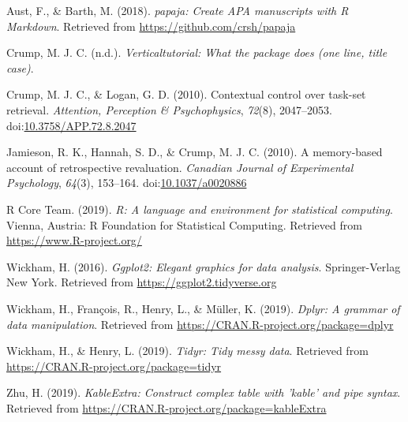 \documentclass[
  man]{apa6}
\newlength{\cslhangindent}
\newenvironment{cslreferences}%
  {\setlength{\parindent}{0pt}%
  \everypar{\setlength{\hangindent}{\cslhangindent}}\ignorespaces}%
  {\par}
\begin{document}
\hypertarget{refs}{}
\begin{cslreferences}
\leavevmode\hypertarget{ref-R-papaja}{}%
Aust, F., \& Barth, M. (2018). \emph{papaja: Create APA manuscripts with R Markdown}. Retrieved from \url{https://github.com/crsh/papaja}

\leavevmode\hypertarget{ref-R-verticaltutorial}{}%
Crump, M. J. C. (n.d.). \emph{Verticaltutorial: What the package does (one line, title case)}.

\leavevmode\hypertarget{ref-crumpContextualControlTaskset2010}{}%
Crump, M. J. C., \& Logan, G. D. (2010). Contextual control over task-set retrieval. \emph{Attention, Perception \& Psychophysics}, \emph{72}(8), 2047--2053. doi:\href{https://doi.org/10.3758/APP.72.8.2047}{10.3758/APP.72.8.2047}

\leavevmode\hypertarget{ref-jamiesonMemorybasedAccountRetrospective2010}{}%
Jamieson, R. K., Hannah, S. D., \& Crump, M. J. C. (2010). A memory-based account of retrospective revaluation. \emph{Canadian Journal of Experimental Psychology}, \emph{64}(3), 153--164. doi:\href{https://doi.org/10.1037/a0020886}{10.1037/a0020886}

\leavevmode\hypertarget{ref-R-base}{}%
R Core Team. (2019). \emph{R: A language and environment for statistical computing}. Vienna, Austria: R Foundation for Statistical Computing. Retrieved from \url{https://www.R-project.org/}

\leavevmode\hypertarget{ref-R-ggplot2}{}%
Wickham, H. (2016). \emph{Ggplot2: Elegant graphics for data analysis}. Springer-Verlag New York. Retrieved from \url{https://ggplot2.tidyverse.org}

\leavevmode\hypertarget{ref-R-dplyr}{}%
Wickham, H., François, R., Henry, L., \& Müller, K. (2019). \emph{Dplyr: A grammar of data manipulation}. Retrieved from \url{https://CRAN.R-project.org/package=dplyr}

\leavevmode\hypertarget{ref-R-tidyr}{}%
Wickham, H., \& Henry, L. (2019). \emph{Tidyr: Tidy messy data}. Retrieved from \url{https://CRAN.R-project.org/package=tidyr}

\leavevmode\hypertarget{ref-R-kableExtra}{}%
Zhu, H. (2019). \emph{KableExtra: Construct complex table with 'kable' and pipe syntax}. Retrieved from \url{https://CRAN.R-project.org/package=kableExtra}
\end{cslreferences}

\endgroup
\end{document}
